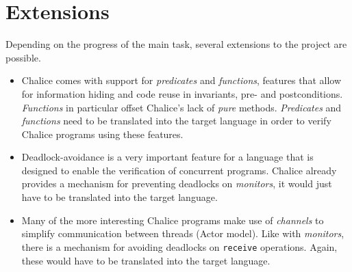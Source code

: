 \documentclass[11pt]{article} %
\begin{document}
\section{Extensions}
Depending on the progress of the main task, several extensions to the project are possible. 
\begin{itemize}
\item Chalice comes with support for \emph{predicates} and \emph{functions}, features that allow for information hiding and code reuse in invariants, pre- and postconditions. \emph{Functions} in particular offset Chalice's lack of \emph{pure} methods. \emph{Predicates} and \emph{functions} need to be translated into the target language in order to verify Chalice programs using these features.
\item Deadlock-avoidance is a very important feature for a language that is designed to enable the verification of concurrent programs. Chalice already provides a mechanism for preventing deadlocks on \emph{monitors}, it would just have to be translated into the target language.
\item Many of the more interesting Chalice programs make use of \emph{channels} to simplify communication between threads (Actor model). Like with \emph{monitors}, there is a mechanism for avoiding deadlocks on \texttt{receive} operations. Again, these would have to be translated into the target language.
\end{itemize}
\end{document}
